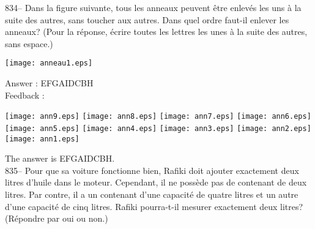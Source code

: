 \documentclass[letterpaper, 12pt]{article}
\begin{document}
834-- Dans la figure suivante, tous les anneaux peuvent \^etre enlev\'es les
uns \`a la suite des autres, sans toucher aux autres.  Dans quel ordre
faut-il enlever les anneaux? (Pour la r\'eponse, \'ecrire toutes les lettres
les unes \`a la suite des autres, sans espace.)\\
    \begin{center}
    \texttt{[image: anneau1.eps]}
    \end{center}


Answer : EFGAIDCBH  \\

Feedback : \\
    \begin{center}
    \texttt{[image: ann9.eps]}
    \texttt{[image: ann8.eps]}
    \texttt{[image: ann7.eps]}
    \texttt{[image: ann6.eps]}
    \texttt{[image: ann5.eps]}
    \texttt{[image: ann4.eps]}
    \texttt{[image: ann3.eps]}
    \texttt{[image: ann2.eps]}
    \texttt{[image: ann1.eps]}
    \end{center}


The answer is EFGAIDCBH.\\

835-- Pour que sa voiture fonctionne bien, Rafiki doit ajouter exactement
deux litres d'huile dans le moteur.  Cependant, il ne poss\`ede pas de
contenant de deux litres.  Par contre, il a un contenant d'une capacit\'e de
quatre litres et un autre d'une capacit\'e de cinq litres.  Rafiki
pourra-t-il mesurer exactement deux litres?  (R\'epondre par oui ou non.)\\
\end{document}
